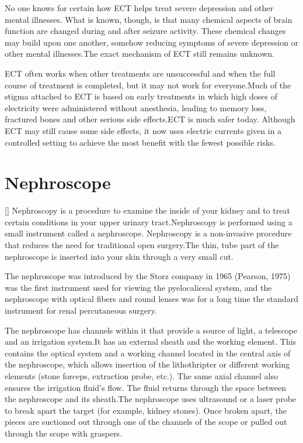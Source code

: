 \documentclass[12pt,A4paper]{article}
\begin{document}
No one knows for certain how ECT helps treat severe depression and other mental illnesses. What is known, though, is that many chemical aspects of brain function are changed during and after seizure activity. These chemical changes may build upon one another, somehow reducing symptoms of severe depression or other mental illnesses.The exact mechanism of ECT still remains unknown.

ECT often works when other treatments are unsuccessful and when the full course of treatment is completed, but it may not work for everyone.Much of the stigma attached to ECT is based on early treatments in which high doses of electricity were administered without anesthesia, leading to memory loss, fractured bones and other serious side effects.ECT is much safer today. Although ECT may still cause some side effects, it now uses electric currents given in a controlled setting to achieve the most benefit with the fewest possible risks.

\newpage
\section{Nephroscope}[\textwidth14pt]
Nephroscopy is a procedure to examine the inside of your kidney and to treat certain conditions in your upper urinary tract.Nephroscopy is performed using a small instrument called a nephroscope. Nephroscopy is a non-invasive procedure that reduces the need for traditional open surgery.The thin, tube part of the nephroscope is inserted into your skin through a very small cut.

The nephroscope was introduced by the Storz company in 1965 (Pearson, 1975) was the first instrument used for viewing the pyelocaliceal system, and the nephroscope with optical fibers and round lenses was for a long time the standard instrument for renal percutaneous surgery.

 The nephroscope has channels within it that provide a source of light, a telescope and an irrigation system.It has an external sheath and the working element. This contains the optical system and a working channel located in the central axis of the nephroscope, which allows insertion of the lithothripter or different working elements (stone forceps, extraction probe, etc.). The same axial channel also ensures the irrigation fluid’s flow. The fluid returns through the space between the nephroscope and its sheath.The nephroscope uses ultrasound or a laser probe to break apart the target (for example, kidney stones). Once broken apart, the pieces are suctioned out through one of the channels of the scope or pulled out through the scope with graspers.
\end{document}

